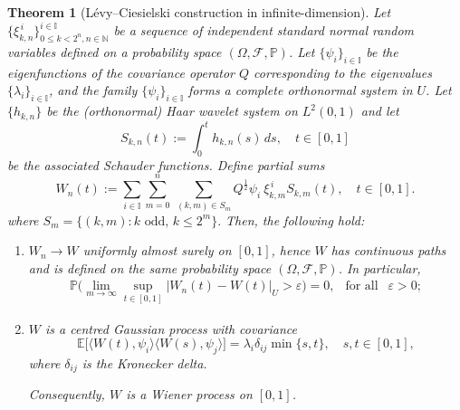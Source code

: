 \documentclass[10pt,a4paper]{amsart}
\newtheorem{theorem}{Theorem}
\newcommand{\N}{\mathbb{N}}
\renewcommand{\P}{\mathbb{P}}
\renewcommand{\emph}[1]{{\sl #1}}
\newcommand{\ep} {\varepsilon }
\newcommand{\la}{\langle}
\newcommand{\ra}{\rangle}
\begin{document}
\begin{theorem}[Lévy--Ciesielski construction in infinite-dimension]\label{LCCthrm}
Let	{$\{\xi^{\,i}_{k,n}\}_{0\le k<2^n,n\in \N}^{i\in \mathbb{I}}$} be a sequence of independent standard normal random variables defined on a probability space 
$(\Omega,\mathcal F,\mathbb P)$.  Let $\{\psi_i\}_{i\in \mathbb{I}}$ be the eigenfunctions of the covariance operator $Q$ corresponding to the eigenvalues $\{\lambda_i\}_{i\in \mathbb{I}}$, and the family $\{\psi_i\}_{i\in \mathbb{I}}$  forms a complete orthonormal system in $U$.
	Let $\{h_{k,n}\}$ be the (orthonormal) Haar wavelet system on $L^2(0,1)$ and let
	\[
	S_{k,n}(t):=\int_0^t h_{k,n}(s)\,ds, \quad t\in[0,1]
	\]
	be the associated Schauder functions. Define partial sums
	\[
{	W_n(t):=\sum_{i\in \mathbb{I}}\sum_{m=0}^{n}\ \sum_{(k,m)\in S_{m}}Q^\frac{1}{2}\psi_i\ \xi^{\,i}_{k,m}S_{k,m}(t),\quad t\in[0,1].}
	\]
	where $S_m=\{(k,m): k \text{ odd, } k\leq 2^m\}.$
	Then, the following hold:
	\begin{enumerate}
		\item $W_n\to W$ \emph{uniformly almost surely} on $[0,1]$, hence $W$ has continuous paths and is defined on the same probability space $(\Omega,\mathcal F,\mathbb P)$. In particular,
			\begin{align*}
			\P \Big(\lim_{m\to\infty}\sup_{t\in[0,1]}\big|W_n(t)-W(t)\big|_U>\ep\Big)=0, \ \ \text{ for all }\ \ \ep>0;
		\end{align*}
		\item $W$ is a centred Gaussian process with covariance
		{	\[
	\mathbb E\big[\la W(t),\psi_i\ra \la W(s), \psi_j\ra ]=\lambda_i \delta_{ij}\min\{s,t\},\quad s,t\in[0,1],
		\]where $\delta_{ij}$ is the Kronecker delta.}
		
		Consequently, $W$ is a Wiener process on $[0,1]$.
	\end{enumerate}
\end{theorem}
\end{document}

